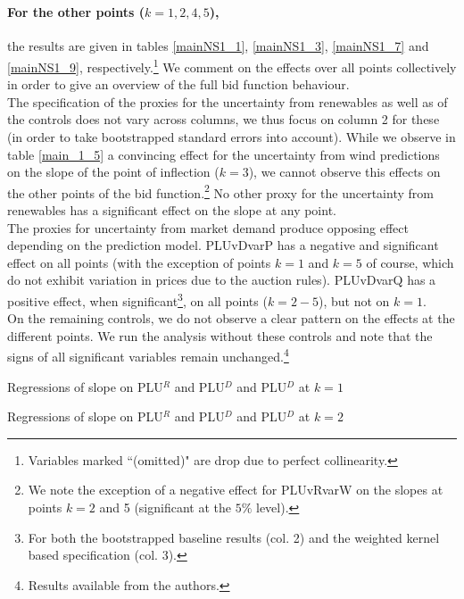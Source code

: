 \section*{}
\paragraph{For the other points  ($k=1,2,4,5$),} the results are given in tables \ref{mainNS1_1}, \ref{mainNS1_3}, \ref{mainNS1_7} and \ref{mainNS1_9}, respectively.\footnote{Variables marked ``(omitted)" are drop due to perfect collinearity.} We comment on the effects over all points collectively in order to give an overview of the full bid function behaviour.\\

The specification of the proxies for the uncertainty from renewables as well as of the controls does not vary across columns, we thus focus on column 2 for these (in order to take bootstrapped standard errors into account). 
While we observe in table \ref{main_1_5} a convincing effect for the uncertainty from wind predictions on the slope of the point of inflection ($k=3$), we cannot observe this effects on the other points of the bid function.\footnote{We note the exception of a negative effect for PLUvRvarW on the slopes at points $k=2$ and 5 (significant at the $5\%$ level).} No other proxy for the uncertainty from renewables has a significant effect on the slope at any point. \\

The proxies for uncertainty from market demand produce opposing effect depending on the prediction model. PLUvDvarP has a negative and significant effect on all points (with the exception of points $k=1$ and $k=5$ of course, which do not exhibit variation in prices due to the auction rules). PLUvDvarQ has a positive effect, when significant\footnote{For both the bootstrapped baseline results (col. 2) and the weighted kernel based specification (col. 3). }, on all points ($k=2-5$), but not on $k=1$. \\

On the remaining controls, we do not observe a clear pattern on the effects at the different points. We run the analysis without these controls and note that the signs of all significant variables remain unchanged.\footnote{Results available from the authors.}\\

\begin{table}[!ht]
\vspace{-2.5cm}

\vspace{-0.2cm}
\caption{\label{mainNS1_1} Regressions of slope on PLU$^R$ and PLU$^{D}$ and PLU$^{D}$ at $k=1$}
\vspace{0.9cm}

\vspace{-0.2cm}
\caption{\label{mainNS1_3} Regressions of slope on PLU$^R$ and PLU$^{D}$ and PLU$^{D}$ at $k=2$}
\end{table}
\pagestyle{empty}

